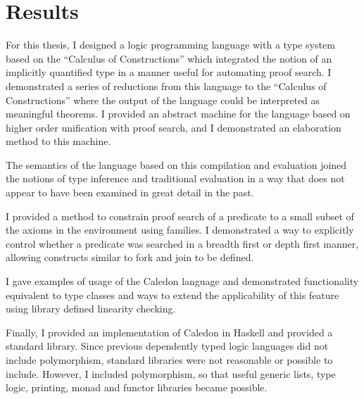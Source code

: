 \section{Results}

For this thesis, I designed a logic programming language with a type system based on the
``Calculus of Constructions'' which integrated the notion of an implicitly quantified type in
a manner useful for automating proof search. I demonstrated a series of reductions from
this language to the ``Calculus of Constructions'' where the output of the language could
be interpreted as meaningful theorems. I provided an abstract machine for the language
based on higher order unification with proof search, and I demonstrated an elaboration
method to this machine. 

The semantics of the language based on this compilation and
evaluation joined the notions of type inference and traditional evaluation in a way that
does not appear to have been examined in great detail in the past.

I provided a method to constrain proof search of a predicate to a small subset of the
axioms in the environment using families. I demonstrated a way to explicitly control
whether a predicate was searched in a breadth first or depth first manner, allowing
constructs similar to fork and join to be defined.

I gave examples of usage of the Caledon language and demonstrated functionality
equivalent to type classes and ways to extend the applicability of this feature using library defined linearity checking.  

Finally, I provided an implementation of Caledon in Haskell and provided a
standard library. Since previous dependently typed logic languages did not include
polymorphism, standard libraries were not reasonable or possible to include. However, I included 
polymorphism, so that useful generic lists, type logic, printing, monad and
functor libraries became possible.
